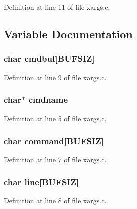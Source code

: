 Definition at line 11 of file xargs.c.



\subsection{Variable Documentation}
\subsubsection[{cmdbuf}]{\setlength{\rightskip}{0pt plus 5cm}char {\bf cmdbuf}[BUFSIZ]}\label{xargs_8c_ade9ac092c01bd2928da8ccafdaf1784d}


Definition at line 9 of file xargs.c.

\subsubsection[{cmdname}]{\setlength{\rightskip}{0pt plus 5cm}char$\ast$ {\bf cmdname}}\label{xargs_8c_a64740ed73b14229a7dee68096183ade1}


Definition at line 5 of file xargs.c.

\subsubsection[{command}]{\setlength{\rightskip}{0pt plus 5cm}char {\bf command}[BUFSIZ]}\label{xargs_8c_a009e818bc5f4dfe73a1c15faeb7fa905}


Definition at line 7 of file xargs.c.

\subsubsection[{line}]{\setlength{\rightskip}{0pt plus 5cm}char {\bf line}[BUFSIZ]}\label{xargs_8c_a83f23e485510c2b3400f31ffe9cde122}


Definition at line 8 of file xargs.c.

